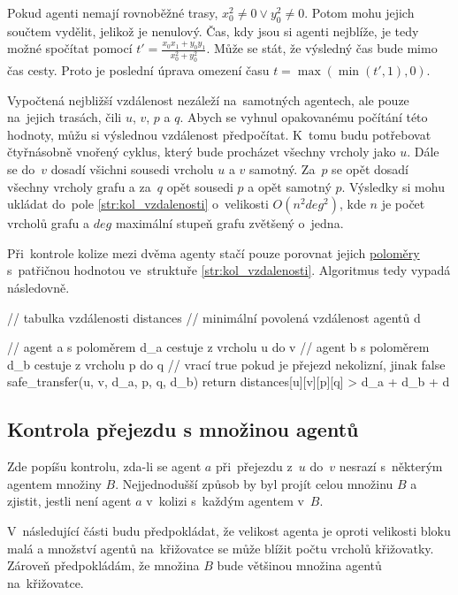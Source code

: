 Pokud agenti nemají rovnoběžné trasy, $x^2_0 \neq 0 \vee y^2_0 \neq 0$.
Potom mohu jejich součtem vydělit, jelikož je nenulový.
Čas, kdy jsou si agenti nejblíže, je tedy možné spočítat pomocí $t' = \frac{x_0 x_1 + y_0 y_1}{x^2_0 + y^2_0}$.
Může se stát, že výsledný čas bude mimo čas cesty.
Proto je poslední úprava omezení času $t = \max(\min(t', 1), 0)$.

Vypočtená nejbližší vzdálenost nezáleží na~samotných agentech, ale pouze na~jejich trasách, čili $u$, $v$, $p$ a $q$.
Abych se vyhnul opakovanému počítání této hodnoty, můžu si výslednou vzdálenost předpočítat.
K~tomu budu potřebovat čtyřnásobně vnořený cyklus, který bude procházet všechny vrcholy jako $u$.
Dále se do~$v$ dosadí všichni sousedi vrcholu $u$ a $v$ samotný.
Za~$p$ se opět dosadí všechny vrcholy grafu a za~$q$ opět sousedi $p$ a opět samotný $p$.
Výsledky si mohu ukládat do~pole \ref{str:kol_vzdalenosti}
o~velikosti $O(n^2 deg^2)$, kde $n$ je počet vrcholů grafu a $deg$ maximální stupeň grafu zvětšený o~jedna.

Při~kontrole kolize mezi dvěma agenty stačí pouze porovnat jejich \hyperref[par:polomer_agent]{poloměry}
s~patřičnou hodnotou ve~struktuře \ref{str:kol_vzdalenosti}.
Algoritmus tedy vypadá následovně.
\begin{code}[fontsize=\footnotesize]
// tabulka vzdálenosti distances
// minimální povolená vzdálenost agentů d

// agent a s poloměrem d_a cestuje z vrcholu u do v
// agent b s poloměrem d_b cestuje z vrcholu p do q
// vrací true pokud je přejezd nekolizní, jinak false
safe_transfer(u, v, d_a, p, q, d_b)
	return distances[u][v][p][q] > d_a + d_b + d
\end{code}

\subsection{Kontrola přejezdu s množinou agentů}\label{subsec:kontrola_prejezdu_mnozina_agentu}

Zde popíšu kontrolu, zda-li se agent $a$ při~přejezdu z~$u$ do~$v$ nesrazí s~některým agentem množiny $B$.
Nejjednodušší způsob by byl projít celou množinu $B$ a zjistit, jestli není agent $a$ v~kolizi s~každým agentem v~$B$.

V~následující části budu předpokládat, že velikost agenta je oproti velikosti bloku malá a
množství agentů na~křižovatce se může blížit počtu vrcholů křižovatky.
Zároveň předpokládám, že množina $B$ bude většinou množina agentů na~křižovatce.


